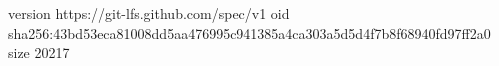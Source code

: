 version https://git-lfs.github.com/spec/v1
oid sha256:43bd53eca81008dd5aa476995c941385a4ca303a5d5d4f7b8f68940fd97ff2a0
size 20217

